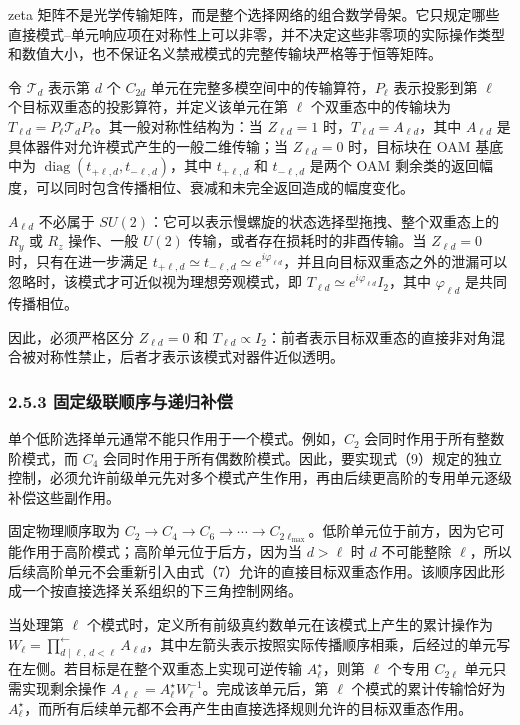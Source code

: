 \documentclass[
  UTF8,
  zihao=-4,
  fontset=fandol]{ctexart}
\begin{document}
zeta
矩阵不是光学传输矩阵，而是整个选择网络的组合数学骨架。它只规定哪些直接模式--单元响应项在对称性上可以非零，并不决定这些非零项的实际操作类型和数值大小，也不保证名义禁戒模式的完整传输块严格等于恒等矩阵。

令 \(\mathcal T_d\) 表示第 \(d\) 个 \(C_{2d}\)
单元在完整多模空间中的传输算符，\(P_\ell\) 表示投影到第 \(\ell\)
个目标双重态的投影算符，并定义该单元在第 \(\ell\) 个双重态中的传输块为
\(T_{\ell d}=P_\ell\mathcal T_dP_\ell\)。其一般对称性结构为：当
\(Z_{\ell d}=1\) 时，\(T_{\ell d}=A_{\ell d}\)，其中 \(A_{\ell d}\)
是具体器件对允许模式产生的一般二维传输；当 \(Z_{\ell d}=0\) 时，目标块在
OAM 基底中为 \(\operatorname{diag}(t_{+\ell,d},t_{-\ell,d})\)，其中
\(t_{+\ell,d}\) 和 \(t_{-\ell,d}\) 是两个 OAM
剩余类的返回幅度，可以同时包含传播相位、衰减和未完全返回造成的幅度变化。

\(A_{\ell d}\) 不必属于
\(SU(2)\)：它可以表示慢螺旋的状态选择型拖拽、整个双重态上的 \(R_y\) 或
\(R_z\) 操作、一般 \(U(2)\) 传输，或者存在损耗时的非酉传输。当
\(Z_{\ell d}=0\) 时，只有在进一步满足
\(t_{+\ell,d}\simeq t_{-\ell,d}\simeq e^{i\varphi_{\ell d}}\)，并且向目标双重态之外的泄漏可以忽略时，该模式才可近似视为理想旁观模式，即
\(T_{\ell d}\simeq e^{i\varphi_{\ell d}}I_2\)，其中 \(\varphi_{\ell d}\)
是共同传播相位。

因此，必须严格区分 \(Z_{\ell d}=0\) 和
\(T_{\ell d}\propto I_2\)：前者表示目标双重态的直接非对角混合被对称性禁止，后者才表示该模式对器件近似透明。

\hypertarget{ux56faux5b9aux7ea7ux8054ux987aux5e8fux4e0eux9012ux5f52ux8865ux507f}{%
\subsubsection{2.5.3
固定级联顺序与递归补偿}\label{ux56faux5b9aux7ea7ux8054ux987aux5e8fux4e0eux9012ux5f52ux8865ux507f}}

单个低阶选择单元通常不能只作用于一个模式。例如，\(C_2\)
会同时作用于所有整数阶模式，而 \(C_4\)
会同时作用于所有偶数阶模式。因此，要实现式（9）规定的独立控制，必须允许前级单元先对多个模式产生作用，再由后续更高阶的专用单元逐级补偿这些副作用。

固定物理顺序取为
\(C_2\rightarrow C_4\rightarrow C_6\rightarrow\cdots\rightarrow C_{2\ell_{\max}}\)。低阶单元位于前方，因为它可能作用于高阶模式；高阶单元位于后方，因为当
\(d>\ell\) 时 \(d\) 不可能整除
\(\ell\)，所以后续高阶单元不会重新引入由式（7）允许的直接目标双重态作用。该顺序因此形成一个按直接选择关系组织的下三角控制网络。

当处理第 \(\ell\)
个模式时，定义所有前级真约数单元在该模式上产生的累计操作为
\(W_\ell=\prod_{d\mid\ell,\,d<\ell}^{\leftarrow}A_{\ell d}\)，其中左箭头表示按照实际传播顺序相乘，后经过的单元写在左侧。若目标是在整个双重态上实现可逆传输
\(A_\ell^\star\)，则第 \(\ell\) 个专用 \(C_{2\ell}\)
单元只需实现剩余操作
\(A_{\ell\ell}=A_\ell^\star W_\ell^{-1}\)。完成该单元后，第 \(\ell\)
个模式的累计传输恰好为
\(A_\ell^\star\)，而所有后续单元都不会再产生由直接选择规则允许的目标双重态作用。
\end{document}
